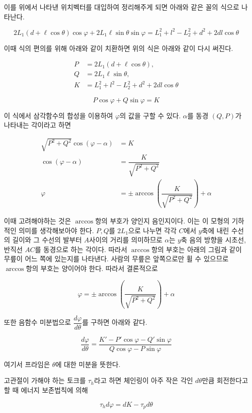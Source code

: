 이를 위에서 나타낸 위치벡터를 대입하여 정리해주게 되면 아래와 같은 꼴의 식으로 나타난다.

\[2L_1(d+\ell\cos\theta)\cos\varphi + 2L_1\ell\sin\theta\sin\varphi = L_1^2+l^2-L_2^2+d^2+2dl\cos\theta\]

이때 식의 편의를 위해 아래와 같이 치환하면 위의 식은 아래와 같이 다시 써진다.

\[
\begin{aligned}
P&=2L_1(d+\ell\cos\theta),\\
Q&=2L_1\ell\sin\theta,\\
K&=L_1^2+l^2-L_2^2+d^2+2dl\cos\theta
\end{aligned}
\]

\[P\cos\varphi + Q\sin\varphi = K\]

이 식에서 삼각함수의 합성을 이용하여 \(\varphi\)의 값을 구할 수 있다. \(\alpha\)를 동경 \((Q,P)\)가 나타내는 각이라고 하면

\[
    \begin{aligned}
        \sqrt{P^2+Q^2}\cos(\varphi-\alpha) &= K \\
        \cos(\varphi-\alpha) &= \dfrac{K}{\sqrt{P^2+Q^2}} \\
        \varphi &= \pm\arccos\left(\dfrac{K}{\sqrt{P^2+Q^2}}\right)+\alpha
    \end{aligned}
\]

이때 고려해야하는 것은 \(\arccos\)항의 부호가 양인지 음인지이다. 이는 이 모형의 기하적인 의미를 생각해보아야 한다. \(P,Q\)를 \(2L_1\)으로 나누면 각각 \(C\)에서 \(y\)축에 내린 수선의 길이와 그 수선의 발부터 \(A\)사이의 거리를 의미하므로 \(\alpha\)는 \(y\)축 음의 방향을 시초선, 반직선 \(AC\)를 동경으로 하는 각이다. 따라서 \(\arccos\)항의 부호는 아래의 그림과 같이 무릎이 어느 쪽에 있는지를 나타낸다. 사람의 무릎은 앞쪽으로만 휠 수 있으므로 \(\arccos\)항의 부호는 양이어야 한다. 따라서 결론적으로

\[\varphi = \pm\arccos\left(\dfrac{K}{\sqrt{P^2+Q^2}}\right)+\alpha\]

또한 음함수 미분법으로 \(\dfrac{d\varphi}{d\theta}\)를 구하면 아래와 같다.

\[\frac{d\varphi}{d\theta}=\frac{K'-P'\cos\varphi-Q'\sin\varphi}{Q\cos\varphi-P\sin\varphi}\]


여기서 프라임은 \(\theta\)에 대한 미분을 뜻한다.



고관절이 가해야 하는 토크를 \(\tau_h\)라고 하면 체인링이 아주 작은 각인 \(d\theta\)만큼 회전한다고 할 때 에너지 보존법칙에 의해

\[\tau_hd\varphi = dK - \tau_pd\theta\]


